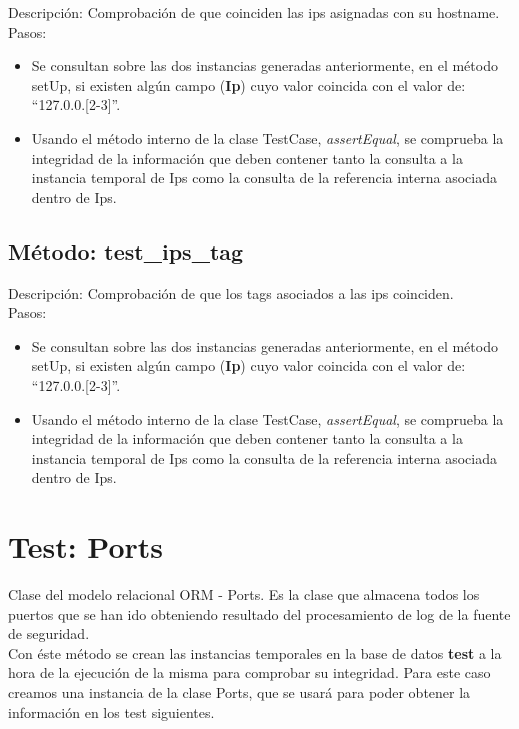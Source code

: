 Descripción: Comprobación de que coinciden las ips asignadas con su hostname.\\
Pasos:
\begin{itemize}
\item Se consultan sobre las dos instancias generadas anteriormente, en el método setUp, si existen algún campo (\textbf{Ip}) cuyo valor coincida con el valor de: ``127.0.0.[2-3]''.
\item Usando el método interno de la clase TestCase, \emph{assertEqual}, se comprueba la integridad de la información que deben contener tanto la consulta a la instancia temporal de Ips como la consulta de la referencia interna asociada dentro de Ips.
\end{itemize}



\subsection{\quad Método: test\_ips\_tag}

Descripción: Comprobación de que los tags asociados a las ips coinciden.\\
Pasos:
\begin{itemize}
\item Se consultan sobre las dos instancias generadas anteriormente, en el método setUp, si existen algún campo (\textbf{Ip}) cuyo valor coincida con el valor de: ``127.0.0.[2-3]''.
\item Usando el método interno de la clase TestCase, \emph{assertEqual}, se comprueba la integridad de la información que deben contener tanto la consulta a la instancia temporal de Ips como la consulta de la referencia interna asociada dentro de Ips.
\end{itemize}



\section{\quad Test: Ports}

Clase del modelo relacional ORM - Ports. Es la clase que almacena todos los puertos que se han ido obteniendo resultado del procesamiento de log de la fuente de seguridad.\\

Con éste método se crean las instancias temporales en la base de datos \textbf{test} a la hora de la ejecución de la misma para comprobar su integridad. Para este caso creamos una instancia de la clase Ports, que se usará para poder obtener la información en los test siguientes.\\

